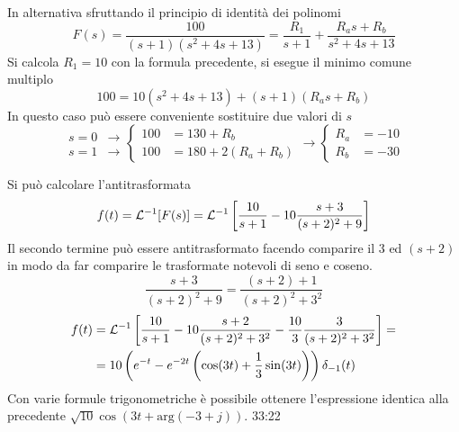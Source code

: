 In alternativa sfruttando il principio di identità dei polinomi
$$
F(s) = \frac{100}{(s+1)(s^2 + 4s + 13)} = \frac{R_1}{s+1} +
\frac{R_as+R_b}{s^2+4s+13}
$$
Si calcola $R_1=10$ con la formula precedente, si esegue il minimo comune
multiplo
$$
100 = 10(s^2+4s + 13)+(s+1)(R_as+R_b)
$$
In questo caso può essere conveniente sostituire due valori di $s$
$$
\begin{aligned}
s=0 &\rightarrow\\
s=1 &\rightarrow
\end{aligned}
\left\{
\begin{aligned}
 100 &= 130 + R_b\\
 100 &= 180 + 2(R_a + R_b)
\end{aligned}\right.
\rightarrow
\left\{
\begin{aligned}
R_a &= -10\\
R_b &= -30
\end{aligned}
\right.
$$

\newpage
Si può calcolare l'antitrasformata
$$
f(t) = \mathcal{L}^{-1} [F(s)] = \mathcal{L}^{-1} \left[
\frac{10}{s+1} -10\frac{s+3}{(s+2)^2+9}
\right]
$$
Il secondo termine può essere antitrasformato facendo comparire il $3$ ed
$(s+2)$ in modo da far comparire le trasformate notevoli di seno e coseno.
$$
\frac{s+3  }{(s+2)^2 + 9}  =\frac{(s+2)+1}{(s+2)^2 + 3^2}
$$
$$\begin{aligned}
f(t) &=
\mathcal{L}^{-1}\left[\frac{10}{s+1}-10\frac{s+2}{(s+2)^2+3^2}-\frac{10}{3}\frac{3
} {(s+2)^2 +3^2} \right] =\\
&= 10\left(e^{-t} -e^{-2t} \left( \cos(3t)+\frac{1}{3}\sin(3t) \right)
\right)\delta_{-1}(t)
\end{aligned}$$
Con varie formule trigonometriche è possibile ottenere l'espressione identica
alla precedente $\sqrt{10}\cos(3t+
\text{arg}(-3+j))$.
33:22
